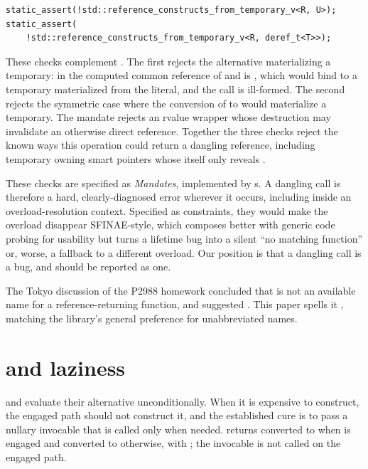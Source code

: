 \documentclass[a4paper,10pt,oneside,openany,final,article]{memoir}
\begin{document}
\begin{verbatim}
static_assert(!std::reference_constructs_from_temporary_v<R, U>);
static_assert(
    !std::reference_constructs_from_temporary_v<R, deref_t<T>>);
\end{verbatim}

These checks complement .
The first rejects the alternative materializing a temporary: in
 the computed common reference of 
and  is , which would bind to a temporary
materialized from the literal, and the call is ill-formed. The second
rejects the symmetric case where the conversion of  to 
would materialize a temporary. The mandate rejects an rvalue wrapper whose
destruction may invalidate an otherwise direct reference. Together the three
checks reject the known ways this operation could return a dangling
reference, including temporary owning smart pointers whose 
itself only reveals .

These checks are specified as \emph{Mandates}, implemented by
s. A dangling call is therefore a hard,
clearly-diagnosed error wherever it occurs, including inside an
overload-resolution context. Specified as constraints, they would make the
overload disappear SFINAE-style, which composes better with generic code
probing for usability but turns a lifetime bug into a silent ``no matching
function'' or, worse, a fallback to a different overload. Our position is that a dangling 
call is a bug, and should be reported as one.

The Tokyo discussion of the P2988 homework concluded that 
is not an available name for a reference-returning function, and suggested
. This paper spells it , matching the
library's general preference for unabbreviated names.

\section{ and laziness}

 and  evaluate their alternative
unconditionally. When it is expensive to construct, the engaged path should
not construct it, and the established cure is to pass a nullary invocable
that is called only when needed.  returns
 converted to  when  is engaged and
 converted to  otherwise, with
; the
invocable is not called on the engaged path.
\end{document}
